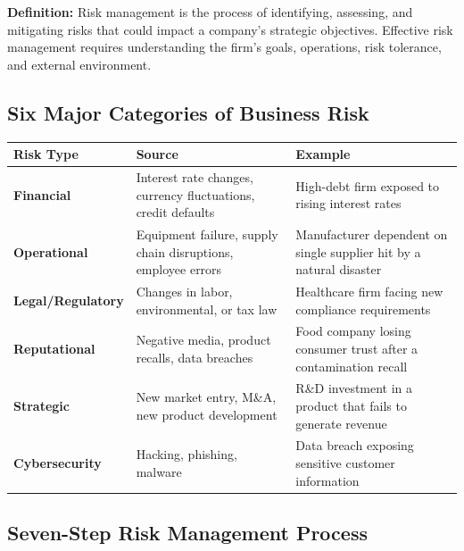 \documentclass[11pt, letterpaper]{article}
\begin{document}
\begin{defbox}
\textbf{Definition:} Risk management is the process of identifying, assessing, and mitigating risks that could impact a company's strategic objectives. Effective risk management requires understanding the firm's goals, operations, risk tolerance, and external environment.
\end{defbox}

\subsection{Six Major Categories of Business Risk}

\begin{center}
\begin{tabular}{>{\bfseries}p{3cm} p{5cm} p{5cm}}
\toprule
Risk Type & Source & Example \\
\midrule
Financial & Interest rate changes, currency fluctuations, credit defaults & High-debt firm exposed to rising interest rates \\
\addlinespace
Operational & Equipment failure, supply chain disruptions, employee errors & Manufacturer dependent on single supplier hit by a natural disaster \\
\addlinespace
Legal/Regulatory & Changes in labor, environmental, or tax law & Healthcare firm facing new compliance requirements \\
\addlinespace
Reputational & Negative media, product recalls, data breaches & Food company losing consumer trust after a contamination recall \\
\addlinespace
Strategic & New market entry, M\&A, new product development & R\&D investment in a product that fails to generate revenue \\
\addlinespace
Cybersecurity & Hacking, phishing, malware & Data breach exposing sensitive customer information \\
\bottomrule
\end{tabular}
\end{center}

\subsection{Seven-Step Risk Management Process}
\end{document}
